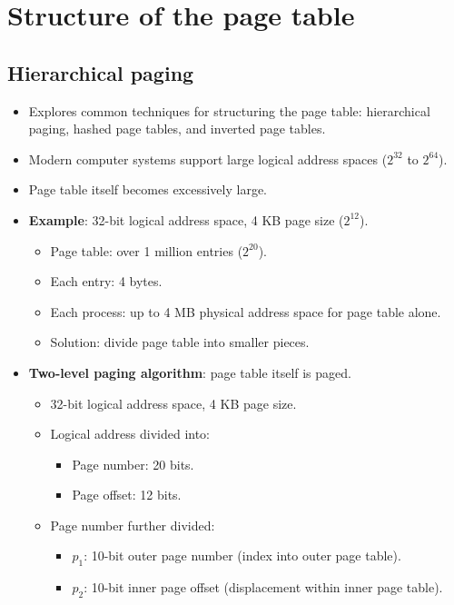 \section{Structure of the page table}

\subsection{Hierarchical paging}
\begin{itemize}
    \item Explores common techniques for structuring the page table: hierarchical paging, hashed page tables, and inverted page tables.
    \item Modern computer systems support large logical address spaces ($2^{32}$ to $2^{64}$).
    \item Page table itself becomes excessively large.
    \item \textbf{Example}: 32-bit logical address space, 4 KB page size ($2^{12}$).
    \begin{itemize}
        \item Page table: over 1 million entries ($2^{20}$).
        \item Each entry: 4 bytes.
        \item Each process: up to 4 MB physical address space for page table alone.
        \item Solution: divide page table into smaller pieces.
    \end{itemize}
    \item \textbf{Two-level paging algorithm}: page table itself is paged.
    \begin{itemize}
        \item 32-bit logical address space, 4 KB page size.
        \item Logical address divided into:
        \begin{itemize}
            \item Page number: 20 bits.
            \item Page offset: 12 bits.
        \end{itemize}
        \item Page number further divided:
        \begin{itemize}
            \item $p_1$: 10-bit outer page number (index into outer page table).
            \item $p_2$: 10-bit inner page offset (displacement within inner page table).
        \end{itemize}

\end{itemize}
\end{itemize}
